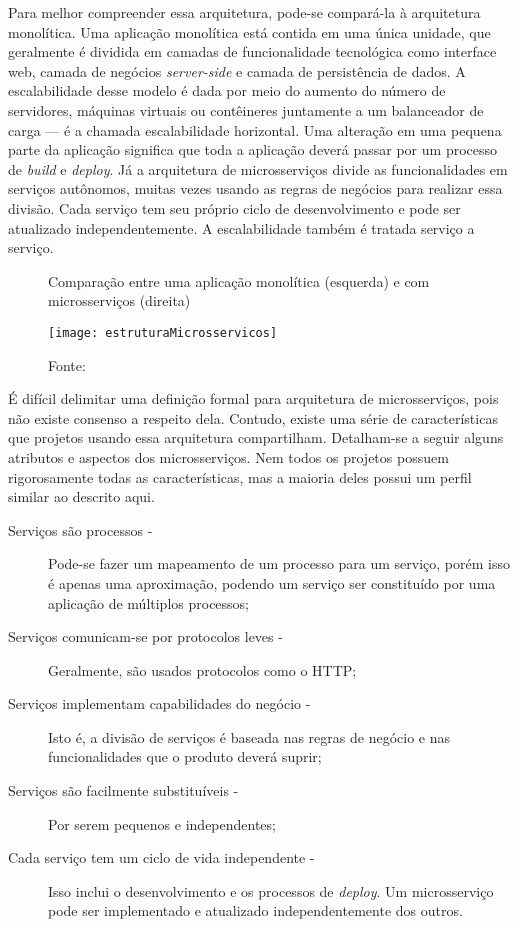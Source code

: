 Para melhor compreender essa arquitetura, pode-se compará-la à arquitetura monolítica. Uma aplicação monolítica está contida em uma única unidade, que geralmente é dividida em camadas de funcionalidade tecnológica como interface web, camada de negócios \emph{server-side} e camada de persistência de dados. A escalabilidade desse modelo é dada por meio do aumento do número de servidores, máquinas virtuais ou contêineres juntamente a um balanceador de carga --- é a chamada escalabilidade horizontal. Uma alteração em uma pequena parte da aplicação significa que toda a aplicação deverá passar por um processo de \textit{build} e \textit{deploy}. Já a arquitetura de microsserviços divide as funcionalidades em serviços autônomos, muitas vezes usando as regras de negócios para realizar essa divisão. Cada serviço tem seu próprio ciclo de desenvolvimento e pode ser atualizado independentemente. A escalabilidade também é tratada serviço a serviço.

\begin{figure}[H]
	\centering
	\caption{Comparação entre uma aplicação monolítica (esquerda) e com microsserviços (direita)}
  \texttt{[image: estruturaMicrosservicos]}
	\caption*{Fonte: \cite{lewis}}
\label{fig:estruturaMicrosservicos}
\end{figure}

É difícil delimitar uma definição formal para arquitetura de microsserviços, pois não existe consenso a respeito dela. Contudo, existe uma série de características que projetos usando essa arquitetura compartilham. Detalham-se a seguir alguns atributos e aspectos dos microsserviços. Nem todos os projetos possuem rigorosamente todas as características, mas a maioria deles possui um perfil similar ao descrito aqui.

\begin{description}
\item[Serviços são processos -]Pode-se fazer um mapeamento de um processo para um serviço, porém isso é apenas uma aproximação, podendo um serviço ser constituído por uma aplicação de múltiplos processos;
\item[Serviços comunicam-se por protocolos leves -]Geralmente, são usados protocolos como o HTTP;
\item[Serviços implementam capabilidades do negócio -]Isto é, a divisão de serviços é baseada nas regras de negócio e nas funcionalidades que o produto deverá suprir;
\item[Serviços são facilmente substituíveis - ]Por serem pequenos e independentes;
\item[Cada serviço tem um ciclo de vida independente -]Isso inclui o desenvolvimento e os processos de \emph{deploy}. Um microsserviço pode ser implementado e atualizado independentemente dos outros.
\end{description}

